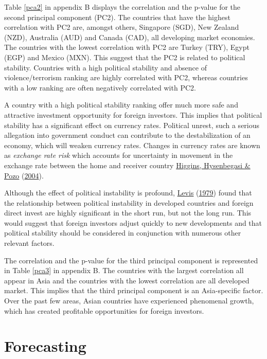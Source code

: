 \documentclass[11pt,preprint, authoryear]{elsarticle}
\numberwithin{equation}{section}
\numberwithin{figure}{section}
\numberwithin{table}{section}
\begin{document}
Table \ref{pca2} in appendix B displays the correlation and the p-value
for the second principal component (PC2). The countries that have the
highest correlation with PC2 are, amongst others, Singapore (SGD), New
Zealand (NZD), Australia (AUD) and Canada (CAD), all developing market
economies. The countries with the lowest correlation with PC2 are Turkey
(TRY), Egypt (EGP) and Mexico (MXN). This suggest that the PC2 is
related to political stability. Countries with a high political
stability and absence of violence/terrorism ranking are highly
correlated with PC2, whereas countries with a low ranking are often
negatively correlated with PC2.

A country with a high political stability ranking offer much more safe
and attractive investment opportunity for foreign investors. This
implies that political stability has a significant effect on currency
rates. Political unrest, such a serious allegation into government
conduct can contribute to the destabilization of an economy, which will
weaken currency rates. Changes in currency rates are known as
\emph{exchange rate risk} which accounts for uncertainty in movement in
the exchange rate between the home and receiver country
\protect\hyperlink{ref-higg}{Higgins, Hysenbegasi \& Pozo}
(\protect\hyperlink{ref-higg}{2004}).

Although the effect of political instability is profound,
\protect\hyperlink{ref-levis}{Levis}
(\protect\hyperlink{ref-levis}{1979}) found that the relationship
between political instability in developed countries and foreign direct
invest are highly significant in the short run, but not the long run.
This would suggest that foreign investors adjust quickly to new
developments and that political stability should be considered in
conjunction with numerous other relevant factors.

The correlation and the p-value for the third principal component is
represented in Table \ref{pca3} in appendix B. The countries with the
largest correlation all appear in Asia and the countries with the lowest
correlation are all developed market. This implies that the third
principal component is an Asia-specific factor. Over the past few areas,
Asian countries have experienced phenomenal growth, which has created
profitable opportunities for foreign investors.

\hypertarget{forecasting}{%
\section{Forecasting}\label{forecasting}}
\end{document}
